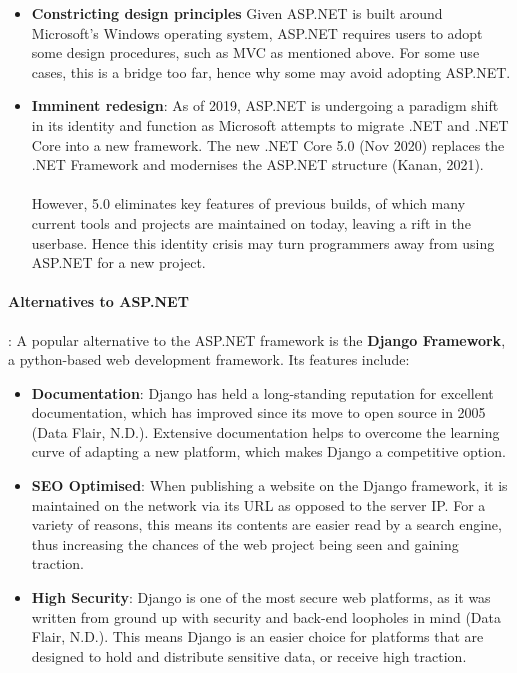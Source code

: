 \documentclass[a4paper, 11pt]{report}
\begin{document}
	\begin{itemize}
	    \item \textbf{Constricting design principles} Given ASP.NET is built around Microsoft's Windows operating system, ASP.NET requires users to adopt some design procedures, such as MVC as mentioned above. For some use cases, this is a bridge too far, hence why some may avoid adopting ASP.NET.

	    \item \textbf{Imminent redesign}: As of 2019, ASP.NET is undergoing a paradigm shift in its identity and function as Microsoft attempts to migrate .NET and .NET Core into a new framework. The new .NET Core 5.0 (Nov 2020) replaces the .NET Framework and modernises the ASP.NET structure (Kanan, 2021).
	    \\
	    \\However, 5.0 eliminates key features of previous builds, of which many current tools and projects are maintained on today, leaving a rift in the userbase. Hence this identity crisis may turn programmers away from using ASP.NET for a new project.
	\end{itemize}

	\paragraph{Alternatives to ASP.NET}: A popular alternative to the ASP.NET framework is the \textbf{Django Framework}, a python-based web development framework. Its features include:

	\begin{itemize}
	    \item \textbf{Documentation}: Django has held a long-standing reputation for excellent documentation, which has improved since its move to open source in 2005 (Data Flair, N.D.). Extensive documentation helps to overcome the learning curve of adapting a new platform, which makes Django a competitive option.

	    \item \textbf{SEO Optimised}: When publishing a website on the Django framework, it is maintained on the network via its URL as opposed to the server IP. For a variety of reasons, this means its contents are easier read by a search engine, thus increasing the chances of the web project being seen and gaining traction.

	    \item \textbf{High Security}: Django is one of the most secure web platforms, as it was written from ground up with security and back-end loopholes in mind (Data Flair, N.D.). This means Django is an easier choice for platforms that are designed to hold and distribute sensitive data, or receive high traction.
	\end{itemize}
\end{document}
